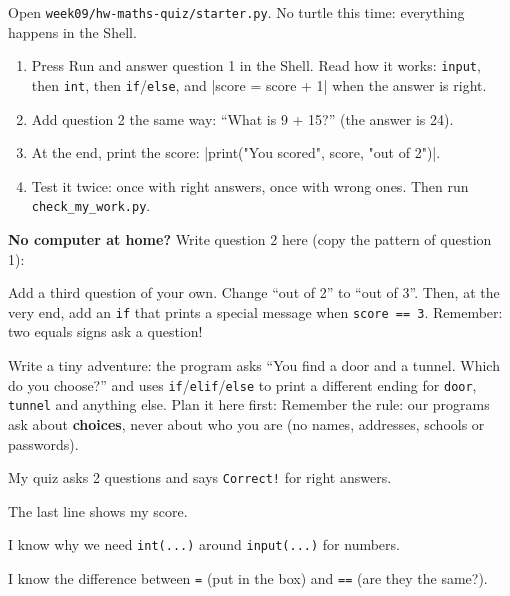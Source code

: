 \namedateline

\begin{core}
Open \texttt{week09/hw-maths-quiz/starter.py}. No turtle this time: everything happens in the Shell.
\begin{enumerate}[leftmargin=1.4em,itemsep=1pt]
  \item Press Run and answer question 1 in the Shell. Read how it works: \texttt{input}, then \texttt{int}, then \texttt{if}/\texttt{else}, and \py|score = score + 1| when the answer is right.
  \item Add question 2 the same way: \enquote{What is 9 + 15?} (the answer is 24).
  \item At the end, print the score: \py|print("You scored", score, "out of 2")|.
  \item Test it twice: once with right answers, once with wrong ones. Then run \texttt{check\_my\_work.py}.
\end{enumerate}
\textbf{No computer at home?} Write question 2 here (copy the pattern of question 1):
\end{core}

\begin{challenge}
Add a third question of your own. Change \enquote{out of 2} to \enquote{out of 3}. Then, at the very end, add an \texttt{if} that prints a special message when \texttt{score == 3}. Remember: two equals signs ask a question!
\end{challenge}

\begin{creative}
Write a tiny adventure: the program asks \enquote{You find a door and a tunnel. Which do you choose?} and uses \texttt{if}/\texttt{elif}/\texttt{else} to print a different ending for \texttt{door}, \texttt{tunnel} and anything else. Plan it here first:
Remember the rule: our programs ask about \textbf{choices}, never about who you are (no names, addresses, schools or passwords).
\end{creative}

\begin{selfcheck}
  \item My quiz asks 2 questions and says \texttt{Correct!} for right answers.
  \item The last line shows my score.
  \item I know why we need \texttt{int(...)} around \texttt{input(...)} for numbers.
  \item I know the difference between \texttt{=} (put in the box) and \texttt{==} (are they the same?).
\end{selfcheck}
